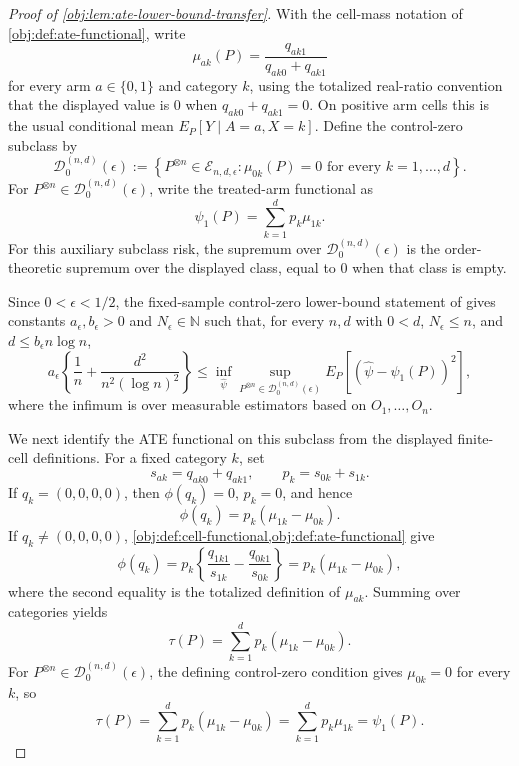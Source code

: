\documentclass[11pt]{article}
\begin{document}
\begin{proof}[Proof of \cref{obj:lem:ate-lower-bound-transfer}]
With the cell-mass notation of \cref{obj:def:ate-functional}, write
\[
\mu_{ak}(P)=\frac{q_{ak1}}{q_{ak0}+q_{ak1}}
\]
for every arm \(a\in\{0,1\}\) and category \(k\), using the totalized real-ratio convention that the displayed value is \(0\) when \(q_{ak0}+q_{ak1}=0\).  On positive arm cells this is the usual conditional mean \(E_P[Y\mid A=a,X=k]\).
Define the control-zero subclass by
\[
\mathcal D_0^{(n,d)}(\epsilon)
:=
\left\{
P^{\otimes n}\in\mathcal E_{n,d,\epsilon}:
\mu_{0k}(P)=0\text{ for every }k=1,\ldots,d
\right\}.
\]
For \(P^{\otimes n}\in\mathcal D_0^{(n,d)}(\epsilon)\), write the treated-arm functional as
\[
\psi_1(P)=\sum_{k=1}^d p_k\mu_{1k}.
\]
For this auxiliary subclass risk, the supremum over \(\mathcal D_0^{(n,d)}(\epsilon)\) is the order-theoretic supremum over the displayed class, equal to \(0\) when that class is empty.

Since \(0<\epsilon<1/2\), the fixed-sample control-zero lower-bound statement of \citep{ZengBalakrishnanHanKennedy2024} gives constants \(a_\epsilon,b_\epsilon>0\) and \(N_\epsilon\in\mathbb N\) such that, for every \(n,d\) with \(0<d\), \(N_\epsilon\le n\), and \(d\le b_\epsilon n\log n\),
\[
a_\epsilon\left\{\frac1n+\frac{d^2}{n^2(\log n)^2}\right\}
\le
\inf_{\widehat\psi}
\sup_{P^{\otimes n}\in\mathcal D_0^{(n,d)}(\epsilon)}
E_P\!\left[(\widehat\psi-\psi_1(P))^2\right],
\]
where the infimum is over measurable estimators based on \(O_1,\ldots,O_n\).

We next identify the ATE functional on this subclass from the displayed finite-cell definitions.  For a fixed category \(k\), set
\[
s_{ak}=q_{ak0}+q_{ak1},
\qquad
p_k=s_{0k}+s_{1k}.
\]
If \(q_k=(0,0,0,0)\), then \(\phi(q_k)=0\), \(p_k=0\), and hence
\[
\phi(q_k)=p_k(\mu_{1k}-\mu_{0k}).
\]
If \(q_k\ne(0,0,0,0)\), \cref{obj:def:cell-functional,obj:def:ate-functional} give
\[
\phi(q_k)
=
p_k\left\{\frac{q_{1k1}}{s_{1k}}-\frac{q_{0k1}}{s_{0k}}\right\}
=
p_k(\mu_{1k}-\mu_{0k}),
\]
where the second equality is the totalized definition of \(\mu_{ak}\).  Summing over categories yields
\[
\tau(P)=\sum_{k=1}^d p_k(\mu_{1k}-\mu_{0k}).
\]
For \(P^{\otimes n}\in\mathcal D_0^{(n,d)}(\epsilon)\), the defining control-zero condition gives \(\mu_{0k}=0\) for every \(k\), so
\[
\tau(P)
=
\sum_{k=1}^d p_k(\mu_{1k}-\mu_{0k})
=
\sum_{k=1}^d p_k\mu_{1k}
=
\psi_1(P).
\]


\end{proof}
\end{document}
